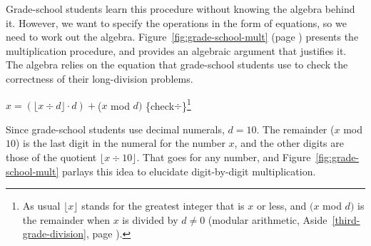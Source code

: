 Grade-school students learn this procedure without knowing
the algebra behind it. However, we want to specify the operations in
the form of equations, so we need to work out the algebra.
Figure~\ref{fig:grade-school-mult} (page \pageref{fig:grade-school-mult})
presents the multiplication procedure, 
and provides an algebraic argument that justifies it.
The algebra relies on the equation
that grade-school students use to check the correctness of their long-division problems.

\hspace{2mm} $x = (\lfloor x \div d \rfloor \cdot d) + $($x$ mod $d)$ \hfill \{check$\div$\}\footnote{As
usual $\lfloor x\rfloor$ stands for the greatest integer that is $x$ or less,
and $(x$ mod $d)$ is the remainder when $x$ is divided by $d \neq 0$ (modular arithmetic,
Aside~\ref{third-grade-division}, page \pageref{third-grade-division}).}
\vspace{2mm}

Since grade-school students use decimal numerals,  $d = 10$.
The remainder ($x$ mod $10$) is the last digit in the numeral for the number $x$,
and the other digits are those of the quotient $\lfloor x \div 10 \rfloor$.
That goes for any number, and
Figure~\ref{fig:grade-school-mult}
parlays this idea to elucidate digit-by-digit multiplication.

